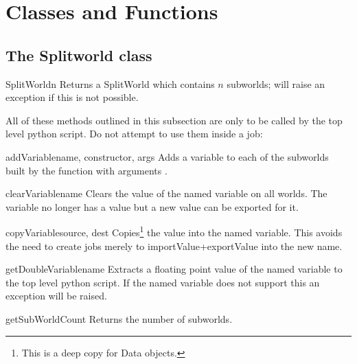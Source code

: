 \section{Classes and Functions}
\label{splitworldClass}
\subsection{The Splitworld class}

\begin{methoddesc}[SplitWorld]{SplitWorld}{n}
Returns a SplitWorld which contains $n$ subworlds; will raise an exception if this is not possible.
\end{methoddesc}

\vspace{\baselineskip}
\noindent All of these methods outlined in this subsection are only to be called by the top level python script. Do not attempt to use them inside a job:

\begin{funcdesc}{addVariable}{name, constructor, args}
Adds a variable to each of the subworlds built by the function  with arguments . 
\end{funcdesc}

\begin{methoddesc}[SplitWorld]{clearVariable}{name}
Clears the value of the named variable on all worlds.
The variable no longer has a value but a new value can be exported for it.
\end{methoddesc}

\begin{methoddesc}[SplitWorld]{copyVariable}{source, dest}
Copies\footnote{ This is a deep copy for Data objects.} the value into the named variable.
This avoids the need to create jobs merely to importValue+exportValue into the new name. \newline
\end{methoddesc}

\begin{methoddesc}[SplitWorld]{getDoubleVariable}{name}
Extracts a floating point value of the named variable to the top level python script.
If the named variable does not support this an exception will be raised.
\end{methoddesc}

\begin{methoddesc}[SplitWorld]{getSubWorldCount}{}
Returns the number of subworlds.
\end{methoddesc}


